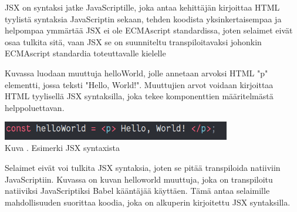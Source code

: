 








JSX on syntaksi jatke JavaScriptille, joka antaa kehittäjän kirjoittaa HTML tyylistä syntaksia JavaScriptin sekaan,
tehden koodista yksinkertaisempaa ja helpompaa ymmärtää
JSX ei ole ECMAscript standardissa, joten selaimet eivät osaa tulkita sitä,
vaan JSX se on suunniteltu transpiloitavaksi johonkin ECMAscript standardia toteuttavalle kielelle
\medskip






Kuvassa \nextImageCount{} luodaan muuttuja helloWorld, jolle annetaan arvoksi HTML "p"{} elementti, jossa teksti "Hello, World!"{}.
Muuttujien arvot voidaan kirjoittaa HTML tyylisellä JSX syntaksilla, 
joka tekee komponenttien määritelmästä helppoluettavan.
\medskip



\bigskip
\includegraphics[width=10cm]{src/public/oppar/pure_jsx_example.png}\\
Kuva \getImgCount {}. Esimerki JSX syntaxista
\medskip




Selaimet eivät voi tulkita JSX syntaksia, joten se pitää transpiloida natiiviin JavaScriptiin.
Kuvassa \nextImageCount{} on kuvan \theimgCounter{} helloworld muuttuja, joka on transpiloitu natiiviksi JavaScriptiksi Babel kääntäjää käyttäen. 
Tämä antaa selaimille mahdollisuuden suorittaa koodia, joka on alkuperin kirjoitettu JSX syntaksilla.
\medskip


